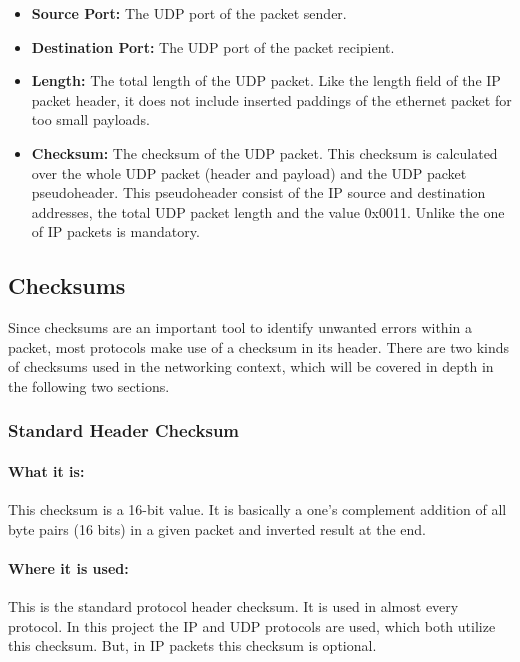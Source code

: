\begin{itemize}
  \item \textbf{Source Port:} The UDP port of the packet sender.
  \item \textbf{Destination Port:} The UDP port of the packet recipient.
  \item \textbf{Length:} The total length of the UDP packet. Like the length field of the IP packet header, it does not include inserted paddings of the ethernet packet for too small payloads.
  \item \textbf{Checksum:} The checksum of the UDP packet. This checksum is calculated over the whole UDP packet (header and payload) and the UDP packet pseudoheader. This pseudoheader consist of the IP source and destination addresses, the total UDP packet length and the value 0x0011. Unlike the one of IP packets is mandatory.
\end{itemize}

\subsection{Checksums}
Since checksums are an important tool to identify unwanted errors within a packet, most protocols make use of a checksum in its header. There are two kinds of checksums used in the networking context, which will be covered in depth in the following two sections.

\subsubsection{Standard Header Checksum}\label{section:basic_checksum}

\paragraph{What it is:}
This checksum is a 16-bit value. It is basically a one's complement addition of all byte pairs (16 bits) in a given packet and inverted result at the end.

\paragraph{Where it is used:}
This is the standard protocol header checksum. It is used in almost every protocol. In this project the IP and UDP protocols are used, which both utilize this checksum. But, in IP packets this checksum is optional.

